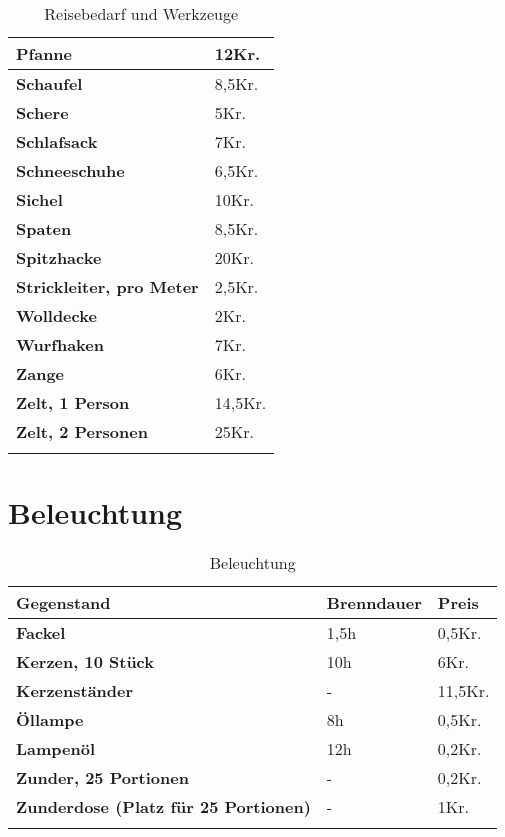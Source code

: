 \begin{longtable}{|p{5cm}|p{2cm}|}
\textbf{Pfanne} & 12Kr. \\ \hline
\textbf{Schaufel} & 8,5Kr. \\ \hline
\textbf{Schere} & 5Kr. \\ \hline
\textbf{Schlafsack} & 7Kr. \\ \hline
\textbf{Schneeschuhe} & 6,5Kr. \\ \hline
\textbf{Sichel} & 10Kr. \\ \hline
\textbf{Spaten} & 8,5Kr. \\ \hline
\textbf{Spitzhacke} & 20Kr. \\ \hline
\textbf{Strickleiter, pro Meter} & 2,5Kr. \\ \hline
\textbf{Wolldecke} & 2Kr. \\ \hline
\textbf{Wurfhaken} & 7Kr. \\ \hline
\textbf{Zange} & 6Kr. \\ \hline
\textbf{Zelt, 1 Person} & 14,5Kr. \\ \hline
\textbf{Zelt, 2 Personen} & 25Kr. \\ \hline

\caption{Reisebedarf und Werkzeuge}
\label{tab:ReisebedarfUndWerkzeuge}
\end{longtable}


\section{Beleuchtung}
\begin{longtable}{|p{5cm}|p{2cm}|p{2cm}|}
\hline
\textbf{Gegenstand} & \textbf{Brenndauer} & \textbf{Preis} \\ \hline
\textbf{Fackel} & 1,5h & 0,5Kr. \\ \hline
\textbf{Kerzen, 10 Stück} & 10h & 6Kr. \\ \hline
\textbf{Kerzenständer} & - & 11,5Kr. \\ \hline
\textbf{Öllampe} & 8h & 0,5Kr. \\ \hline
\textbf{Lampenöl} & 12h & 0,2Kr. \\ \hline
\textbf{Zunder, 25 Portionen} & - & 0,2Kr. \\ \hline
\textbf{Zunderdose (Platz für 25 Portionen)} & - & 1Kr. \\ \hline

\caption{Beleuchtung}
\label{tab:Beleuchtung}
\end{longtable}


